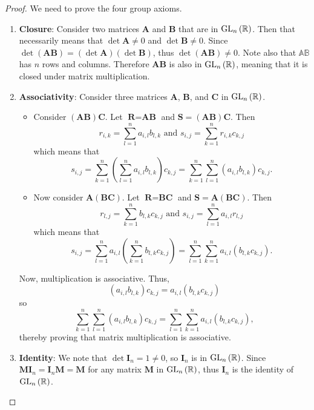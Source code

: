 \begin{proof}
    We need to prove the four group axioms.
    \begin{enumerate}
        \item \textbf{Closure}: Consider two matrices \textbf{A} and \textbf{B} that are in $\mathrm{GL}_{n}\left(\mathbb{R}\right)$. Then that necessarily means that $\det \textbf{A} \neq 0$ and $\det \textbf{B} \neq 0$. Since $\det(\textbf{AB}) = (\det \textbf{A})(\det \textbf{B})$, thus $\det(\textbf{AB}) \neq 0$. Note also that $\mathbb{AB}$ has $n$ rows and columns. Therefore $\textbf{AB}$ is also in $\mathrm{GL}_{n}\left(\mathbb{R}\right)$, meaning that it is closed under matrix multiplication.
        
        \item \textbf{Associativity}: Consider three matrices \textbf{A}, \textbf{B}, and \textbf{C} in $\mathrm{GL}_{n}\left(\mathbb{R}\right)$.
        \begin{itemize}
            \item Consider $(\textbf{AB})\textbf{C}$. Let $\textbf{R} = \textbf{AB}$ and $\textbf{S} = (\textbf{AB})\textbf{C}$. Then
            \[
                r_{i,k} = \sum_{l=1}^n a_{i,l}b_{l,k} \text{ and } s_{i,j} = \sum_{k=1}^n r_{i,k}c_{k,j}
            \]
            which means that
            \[
                s_{i,j} = \sum_{k=1}^n \left(\sum_{l=1}^n a_{i,l}b_{l,k}\right)c_{k,j} = \sum_{k=1}^n \sum_{l=1}^n (a_{i,l}b_{l,k})c_{k,j}.
            \]
            \item Now consider $\textbf{A}(\textbf{BC})$. Let $\textbf{R} = \textbf{BC}$ and $\textbf{S} = \textbf{A}(\textbf{BC})$. Then
            \[
                r_{l,j} = \sum_{k=1}^nb_{l,k}c_{k,j} \text{ and } s_{i,j} = \sum_{l=1}^n a_{i,l}r_{l,j}
            \]
            which means that
            \[
                s_{i,j} = \sum_{l=1}^n a_{i,l}\left(\sum_{k=1}^nb_{l,k}c_{k,j}\right) = \sum_{l=1}^n\sum_{k=1}^n a_{i,l}(b_{l,k}c_{k,j}).
            \]
        \end{itemize}
        Now, multiplication is associative. Thus,
        \[
                (a_{i,l}b_{l,k})c_{k,j} = a_{i,l}(b_{l,k}c_{k,j})
        \]
        so
        \[
            \sum_{k=1}^n \sum_{l=1}^n (a_{i,l}b_{l,k})c_{k,j} = \sum_{l=1}^n\sum_{k=1}^n a_{i,l}(b_{l,k}c_{k,j}),
        \]
        thereby proving that matrix multiplication is associative.
        
        \item \textbf{Identity}: We note that $\det \textbf{I}_n = 1 \neq 0$, so $\textbf{I}_n$ is in $\mathrm{GL}_{n}\left(\mathbb{R}\right)$. Since $\textbf{MI}_n = \textbf{I}_n\textbf{M} = \textbf{M}$ for any matrix $\textbf{M}$ in $\mathrm{GL}_{n}\left(\mathbb{R}\right)$, thus $\textbf{I}_n$ is the identity of $\mathrm{GL}_{n}\left(\mathbb{R}\right)$.
        

\end{enumerate}
\end{proof}
